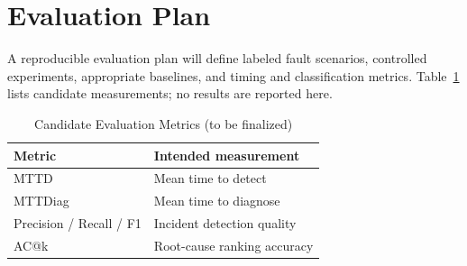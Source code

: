 \section{Evaluation Plan}
\label{sec:evaluation}
A reproducible evaluation plan will define labeled fault scenarios,
controlled experiments, appropriate baselines, and timing and classification metrics.
Table~\ref{tab:metrics} lists candidate measurements; no results are reported here.

\begin{table}[t]
  \caption{Candidate Evaluation Metrics (to be finalized)}
  \label{tab:metrics}
  \centering
  \begin{tabular}{ll}
    \toprule
    Metric & Intended measurement \\
    \midrule
    MTTD & Mean time to detect \\
    MTTDiag & Mean time to diagnose \\
    Precision / Recall / F1 & Incident detection quality \\
    AC@k & Root-cause ranking accuracy \\
    \bottomrule
  \end{tabular}
\end{table}

